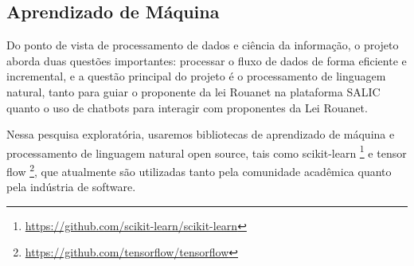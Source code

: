% 
% 




\subsection{Aprendizado de Máquina}

Do ponto de vista de processamento de dados e ciência da informação, o projeto aborda duas questões importantes: 
processar o fluxo de dados de forma eficiente e incremental,
e a questão principal do projeto é o processamento de linguagem natural, tanto para guiar o proponente da lei Rouanet na plataforma SALIC
quanto o uso de chatbots para interagir com proponentes da Lei Rouanet.

Nessa pesquisa exploratória, usaremos bibliotecas de aprendizado de máquina e processamento de linguagem natural open source,
tais como scikit-learn \footnote{\url{https://github.com/scikit-learn/scikit-learn}} e 
tensor flow \footnote{\url{https://github.com/tensorflow/tensorflow}}, que atualmente são utilizadas tanto pela comunidade acadêmica quanto
pela indústria de software.  


